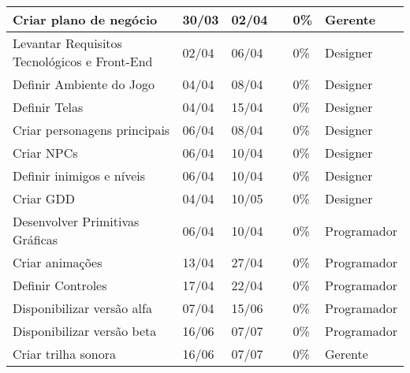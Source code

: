 \documentclass[a4paper, 11pt]{article} %
\begin{document}
\begin{table}[h]
\begin{tabular}{|l|l|l|l|l|l|}
Criar plano de negócio                       & 30/03           & 02/04        &                    & 0\%                & Gerente              \\ \hline
Levantar Requisitos Tecnológicos e Front-End & 02/04           & 06/04        &                    & 0\%                & Designer             \\ \hline
Definir Ambiente do Jogo                     & 04/04           & 08/04        &                    & 0\%                & Designer             \\ \hline
Definir Telas                                & 04/04           & 15/04        &                    & 0\%                & Designer             \\ \hline
Criar personagens principais                 & 06/04           & 08/04        &                    & 0\%                & Designer             \\ \hline
Criar NPCs                                   & 06/04           & 10/04        &                    & 0\%                & Designer             \\ \hline
Definir inimigos e níveis                    & 06/04           & 10/04        &                    & 0\%                & Designer             \\ \hline
Criar GDD                                    & 04/04           & 10/05        &                    & 0\%                & Designer             \\ \hline
Desenvolver Primitivas Gráficas              & 06/04           & 10/04        &                    & 0\%                & Programador          \\ \hline
Criar animações                              & 13/04           & 27/04        &                    & 0\%                & Programador          \\ \hline
Definir Controles                            & 17/04           & 22/04        &                    & 0\%                & Programador          \\ \hline
Disponibilizar versão alfa                   & 07/04           & 15/06        &                    & 0\%                & Programador          \\ \hline
Disponibilizar versão beta                   & 16/06           & 07/07        &                    & 0\%                & Programador          \\ \hline
Criar trilha sonora                          & 16/06           & 07/07        &                    & 0\%                & Gerente              \\ \hline

\end{tabular}
\end{table}
\end{document}
